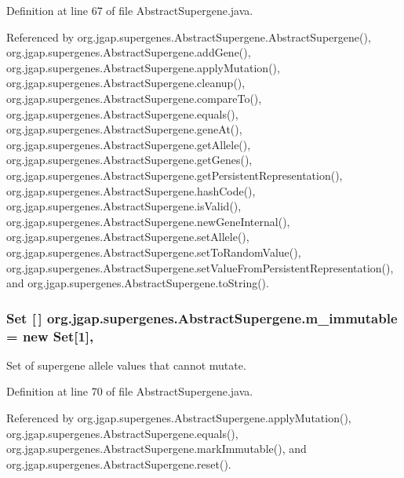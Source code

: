 Definition at line 67 of file Abstract\-Supergene.\-java.



Referenced by org.\-jgap.\-supergenes.\-Abstract\-Supergene.\-Abstract\-Supergene(), org.\-jgap.\-supergenes.\-Abstract\-Supergene.\-add\-Gene(), org.\-jgap.\-supergenes.\-Abstract\-Supergene.\-apply\-Mutation(), org.\-jgap.\-supergenes.\-Abstract\-Supergene.\-cleanup(), org.\-jgap.\-supergenes.\-Abstract\-Supergene.\-compare\-To(), org.\-jgap.\-supergenes.\-Abstract\-Supergene.\-equals(), org.\-jgap.\-supergenes.\-Abstract\-Supergene.\-gene\-At(), org.\-jgap.\-supergenes.\-Abstract\-Supergene.\-get\-Allele(), org.\-jgap.\-supergenes.\-Abstract\-Supergene.\-get\-Genes(), org.\-jgap.\-supergenes.\-Abstract\-Supergene.\-get\-Persistent\-Representation(), org.\-jgap.\-supergenes.\-Abstract\-Supergene.\-hash\-Code(), org.\-jgap.\-supergenes.\-Abstract\-Supergene.\-is\-Valid(), org.\-jgap.\-supergenes.\-Abstract\-Supergene.\-new\-Gene\-Internal(), org.\-jgap.\-supergenes.\-Abstract\-Supergene.\-set\-Allele(), org.\-jgap.\-supergenes.\-Abstract\-Supergene.\-set\-To\-Random\-Value(), org.\-jgap.\-supergenes.\-Abstract\-Supergene.\-set\-Value\-From\-Persistent\-Representation(), and org.\-jgap.\-supergenes.\-Abstract\-Supergene.\-to\-String().

\hypertarget{classorg_1_1jgap_1_1supergenes_1_1_abstract_supergene_a92632c12f27c0aaef1984c8550afe9a1}{
\subsubsection[{m\-\_\-immutable}]{\setlength{\rightskip}{0pt plus 5cm}Set \mbox{[}$\,$\mbox{]} org.\-jgap.\-supergenes.\-Abstract\-Supergene.\-m\-\_\-immutable = new Set\mbox{[}1\mbox{]}\hspace{0.3cm}{\ttfamily [static]}, {\ttfamily [private]}}}\label{classorg_1_1jgap_1_1supergenes_1_1_abstract_supergene_a92632c12f27c0aaef1984c8550afe9a1}
Set of supergene allele values that cannot mutate. 

Definition at line 70 of file Abstract\-Supergene.\-java.



Referenced by org.\-jgap.\-supergenes.\-Abstract\-Supergene.\-apply\-Mutation(), org.\-jgap.\-supergenes.\-Abstract\-Supergene.\-equals(), org.\-jgap.\-supergenes.\-Abstract\-Supergene.\-mark\-Immutable(), and org.\-jgap.\-supergenes.\-Abstract\-Supergene.\-reset().

